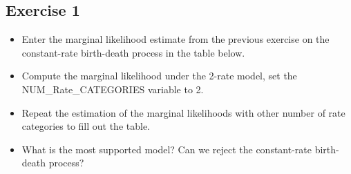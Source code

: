\subsection{Exercise 1}

\begin{itemize}
\item Enter the marginal likelihood estimate from the previous exercise on the constant-rate birth-death process in the table below.
\item Compute the marginal likelihood under the 2-rate model, \IE set the NUM\_Rate\_CATEGORIES variable to 2.
\item Repeat the estimation of the marginal likelihoods with other number of rate categories to fill out the table.
\item What is the most supported model? Can we reject the constant-rate birth-death process?
\end{itemize}

